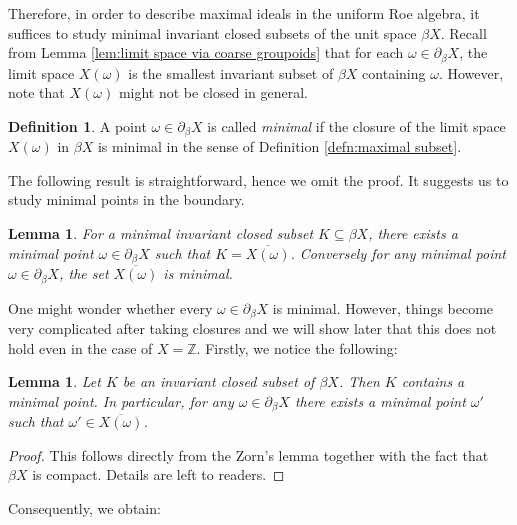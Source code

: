 \documentclass[12pt, a4paper]{amsart}
\numberwithin{equation}{section}
\newtheorem{lem}[thm]{Lemma}
\theoremstyle{definition}
\newtheorem{defn}[thm]{Definition}
\theoremstyle{remark}
\def\ZZ{\mathbb{Z}}
\begin{document}
Therefore, in order to describe maximal ideals in the uniform Roe algebra, it suffices to study minimal invariant closed subsets of the unit space $\beta X$. Recall from Lemma \ref{lem:limit space via coarse groupoids} that for each $\omega \in \partial_\beta X$, the limit space $X(\omega)$ is the smallest invariant subset of $\beta X$ containing $\omega$. However, note that $X(\omega)$ might not be closed in general. 


\begin{defn}\label{defn:minimal point}
A point $\omega \in \partial_\beta X$ is called \emph{minimal} if the closure of the limit space $X(\omega)$ in $\beta X$ is minimal in the sense of Definition \ref{defn:maximal subset}.
\end{defn}

The following result is straightforward, hence we omit the proof. It suggests us to study minimal points in the boundary.

\begin{lem}\label{lem:property of minimal points}
For a minimal invariant closed subset $K \subseteq \beta X$, there exists a minimal point $\omega \in \partial_\beta X$ such that $K= \overline{X(\omega)}$. Conversely for any minimal point $\omega \in \partial_\beta X$, the set $\overline{X(\omega)}$ is minimal.
\end{lem}


One might wonder whether every $\omega \in \partial_\beta X$ is minimal. However, things become very complicated after taking closures and we will show later that this does not hold even in the case of $X=\ZZ$. Firstly, we notice the following:

\begin{lem}\label{lem:existence of min point}
Let $K$ be an invariant closed subset of $\beta X$. Then $K$ contains a minimal point. In particular, for any $\omega \in \partial_\beta X$ there exists a minimal point $\omega'$ such that $\omega' \in \overline{X(\omega)}$.
\end{lem}

\begin{proof}
This follows directly from the Zorn's lemma together with the fact that $\beta X$ is compact. Details are left to readers.
\end{proof}

Consequently, we obtain:
\end{document}
